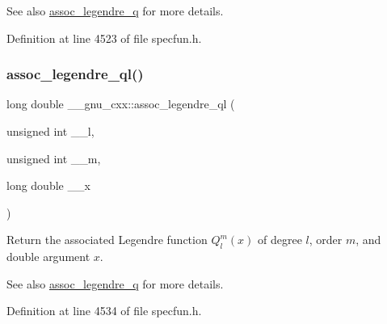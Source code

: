 \begin{DoxySeeAlso}{See also}
\hyperlink{group__gnu__math__spec__func_ga96a1223727fa71ffbf520a98ac3dc885}{assoc\+\_\+legendre\+\_\+q} for more details. 
\end{DoxySeeAlso}


Definition at line 4523 of file specfun.\+h.

\mbox{\label{group__gnu__math__spec__func_ga07a9e571759c6d24e96da8cc8268f91e}} 
\subsubsection{\texorpdfstring{assoc\+\_\+legendre\+\_\+ql()}{assoc\_legendre\_ql()}}
{\footnotesize\ttfamily long double \+\_\+\+\_\+gnu\+\_\+cxx\+::assoc\+\_\+legendre\+\_\+ql (\begin{DoxyParamCaption}\item[{unsigned int}]{\+\_\+\+\_\+l,  }\item[{unsigned int}]{\+\_\+\+\_\+m,  }\item[{long double}]{\+\_\+\+\_\+x }\end{DoxyParamCaption})\hspace{0.3cm}{\ttfamily [inline]}}

Return the associated Legendre function $ Q_l^m(x) $ of degree $ l $, order $ m $, and { double} argument $ x $.

\begin{DoxySeeAlso}{See also}
\hyperlink{group__gnu__math__spec__func_ga96a1223727fa71ffbf520a98ac3dc885}{assoc\+\_\+legendre\+\_\+q} for more details. 
\end{DoxySeeAlso}


Definition at line 4534 of file specfun.\+h.

\mbox{\label{group__gnu__math__spec__func_gac07286d722248a7f3c65a13b49b1fef5}} 
